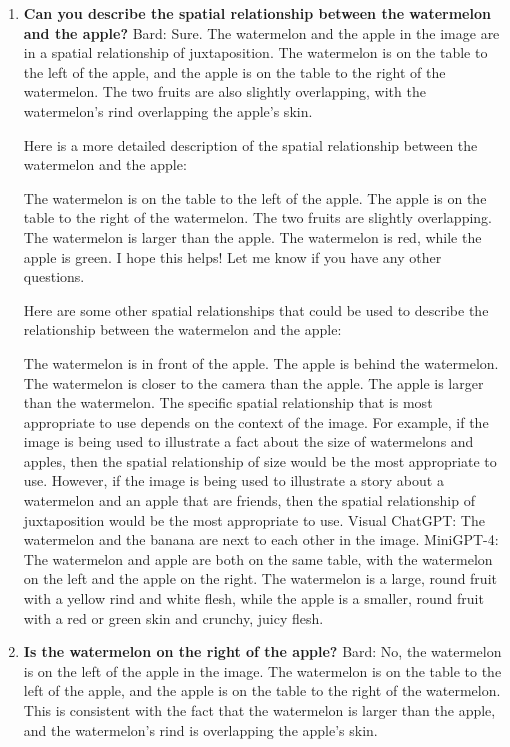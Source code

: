     \begin{enumerate}
        \item \textbf{Can you describe the spatial relationship between the watermelon and the apple?}
        \subitem Bard:
        Sure. The watermelon and the apple in the image are in a spatial relationship of juxtaposition. The watermelon is on the table to the left of the apple, and the apple is on the table to the right of the watermelon. The two fruits are also slightly overlapping, with the watermelon's rind overlapping the apple's skin.

        Here is a more detailed description of the spatial relationship between the watermelon and the apple:

        The watermelon is on the table to the left of the apple.
        The apple is on the table to the right of the watermelon.
        The two fruits are slightly overlapping.
        The watermelon is larger than the apple.
        The watermelon is red, while the apple is green.
        I hope this helps! Let me know if you have any other questions.

        Here are some other spatial relationships that could be used to describe the relationship between the watermelon and the apple:

        The watermelon is in front of the apple.
        The apple is behind the watermelon.
        The watermelon is closer to the camera than the apple.
        The apple is larger than the watermelon.
        The specific spatial relationship that is most appropriate to use depends on the context of the image. For example, if the image is being used to illustrate a fact about the size of watermelons and apples, then the spatial relationship of size would be the most appropriate to use. However, if the image is being used to illustrate a story about a watermelon and an apple that are friends, then the spatial relationship of juxtaposition would be the most appropriate to use.
        \subitem Visual ChatGPT: The watermelon and the banana are next to each other in the image.
        \subitem MiniGPT-4: The watermelon and apple are both on the same table, with the watermelon on the left and the apple on the right. The watermelon is a large, round fruit with a yellow rind and white flesh, while the apple is a smaller, round fruit with a red or green skin and crunchy, juicy flesh.
        \item \textbf{Is the watermelon on the right of the apple?}
        \subitem Bard: 
        No, the watermelon is on the left of the apple in the image. The watermelon is on the table to the left of the apple, and the apple is on the table to the right of the watermelon. This is consistent with the fact that the watermelon is larger than the apple, and the watermelon's rind is overlapping the apple's skin.
        

\end{enumerate}
